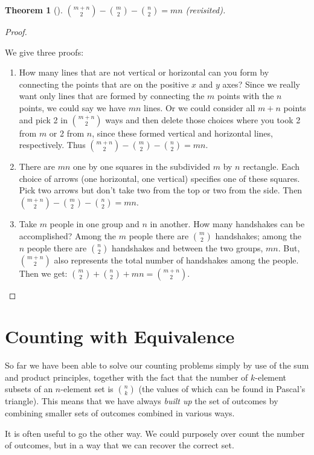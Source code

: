\documentclass[10pt,]{book}
\theoremstyle{plain}
\newtheorem{theorem}{Theorem}[section]
\theoremstyle{definition}
\theoremstyle{definition}
\theoremstyle{definition}
\numberwithin{equation}{chapter}
\begin{document}
\begin{theorem}[{}]\label{theorem-11}
\hypertarget{p-737}{}%
\(\binom{m + n}{2} - \binom{m}{2} - \binom{n}{2} = mn\) (revisited).%
\end{theorem}
\begin{proof}\hypertarget{proof-6}{}
\hypertarget{p-738}{}%
We give three proofs: \leavevmode%
\begin{enumerate}
\item\hypertarget{li-58}{}\hypertarget{p-739}{}%
How many lines that are not vertical or horizontal can you form by connecting the points that are on the positive \(x\) and \(y\) axes? Since we really want only lines that are formed by connecting the \(m\) points with the \(n\) points, we could say we have \(mn\) lines. Or we could consider all \(m + n\) points and pick 2 in \(\binom{m+n}{2}\) ways and then delete those choices where you took 2 from \(m\) or 2 from \(n\), since these formed vertical and horizontal lines, respectively.  Thus \(\binom{m + n}{2} - \binom{m}{2} - \binom{n}{2} = mn\).%
\item\hypertarget{li-59}{}\hypertarget{p-740}{}%
There are \(mn\) one by one squares in the subdivided \(m\) by \(n\) rectangle.  Each choice of arrows (one horizontal, one vertical) specifies one of these squares.  Pick two arrows but don't take two from the top or two from the side.  Then \(\binom{m + n}{2} - \binom{m}{2} - \binom{n}{2} = mn\).%
\item\hypertarget{li-60}{}\hypertarget{p-741}{}%
Take \(m\) people in one group and \(n\) in another. How many handshakes can be accomplished? Among the \(m\) people there are \(\binom{m}{2}\) handshakes; among the \(n\) people there are \(\binom{n}{2}\) handshakes and between the two groups, \(mn\). But, \(\binom{m + n}{2}\) also represents the total number of handshakes among the people. Then we get: \(\binom{m}{2} + \binom{n}{2} + mn = \binom{m + n}{2}\).%
\end{enumerate}
%
\end{proof}
\typeout{************************************************}
\typeout{************************************************}
\section[{Counting with Equivalence}]{Counting with Equivalence}\label{sec_basic-quotient}
\hypertarget{p-742}{}%
So far we have been able to solve our counting problems simply by use of the sum and product principles, together with the fact that the number of \(k\)-element subsets of an \(n\)-element set is \(\binom{n}{k}\) (the values of which can be found in Pascal's triangle). This means that we have always \emph{built up} the set of outcomes by combining smaller sets of outcomes combined in various ways.%
\par
\hypertarget{p-743}{}%
It is often useful to go the other way.  We could purposely over count the number of outcomes, but in a way that we can recover the correct set.%
\typeout{************************************************}
\typeout{************************************************}
\end{document}
